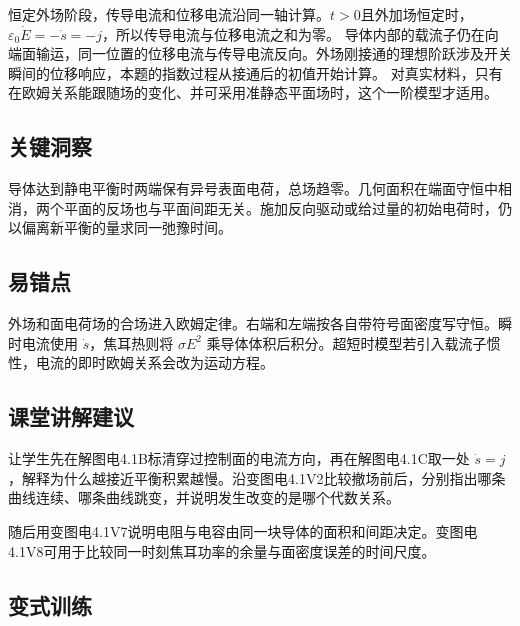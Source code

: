 \documentclass[UTF8,fontset=fandol,a4paper,11pt]{ctexart}
\begin{document}
恒定外场阶段，传导电流和位移电流沿同一轴计算。$t>0$且外加场恒定时，$\varepsilon_0\dot E=-\dot s=-j$，所以传导电流与位移电流之和为零。
导体内部的载流子仍在向端面输运，同一位置的位移电流与传导电流反向。外场刚接通的理想阶跃涉及开关瞬间的位移响应，本题的指数过程从接通后的初值开始计算。
对真实材料，只有在欧姆关系能跟随场的变化、并可采用准静态平面场时，这个一阶模型才适用。




\subsection*{关键洞察}

导体达到静电平衡时两端保有异号表面电荷，总场趋零。几何面积在端面守恒中相消，两个平面的反场也与平面间距无关。施加反向驱动或给过量的初始电荷时，仍以偏离新平衡的量求同一弛豫时间。



\subsection*{易错点}

外场和面电荷场的合场进入欧姆定律。右端和左端按各自带符号面密度写守恒。瞬时电流使用 $\dot s$，焦耳热则将 $\sigma E^2$ 乘导体体积后积分。超短时模型若引入载流子惯性，电流的即时欧姆关系会改为运动方程。



\subsection*{课堂讲解建议}

让学生先在解图电4.1B标清穿过控制面的电流方向，再在解图电4.1C取一处 $\dot s=j$，解释为什么越接近平衡积累越慢。沿变图电4.1V2比较撤场前后，分别指出哪条曲线连续、哪条曲线跳变，并说明发生改变的是哪个代数关系。

随后用变图电4.1V7说明电阻与电容由同一块导体的面积和间距决定。变图电4.1V8可用于比较同一时刻焦耳功率的余量与面密度误差的时间尺度。


\subsection*{变式训练}
\end{document}
